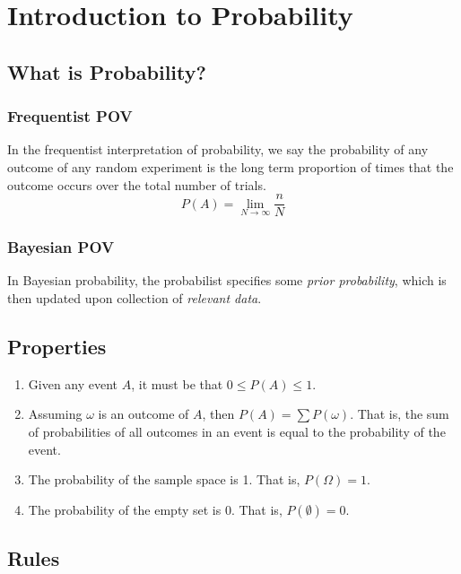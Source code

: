 \section{Introduction to Probability}  %
\subsection{What is Probability?}  %
\subsubsection{Frequentist POV}  %
In the frequentist interpretation of probability, we say the probability of any outcome of any random experiment is the long term proportion of times that the outcome occurs over the total number of trials.
\begin{equation}
    P(A)=\lim_{N\to\infty}\frac{n}{N}
\end{equation}

\subsubsection{Bayesian POV}  %
In Bayesian probability, the probabilist specifies some \emph{prior probability}, which is then updated upon collection of \emph{relevant data}.

\subsection{Properties}  %
\begin{enumerate}
    \item Given any event $A$, it must be that $0\leq P(A) \leq 1$.
    \item Assuming $\omega$ is an outcome of $A$, then $P(A)=\sum P(\omega)$. That is, the sum of probabilities of all outcomes in an event is equal to the probability of the event.
    \item The probability of the sample space is 1. That is, $P(\Omega)=1$.
    \item The probability of the empty set is 0. That is, $P(\emptyset)=0$.
\end{enumerate}

\subsection{Rules}  %
 \\
 \\

